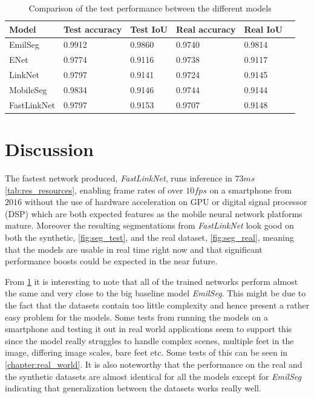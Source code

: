 \documentclass{kththesis}
\begin{document}
\begin{table}[]
\centering
\caption{Comparison of the test performance between the different models}
\label{tab:res_performance}
\begin{tabular}{@{}llllll@{}}
\toprule
Model       & Test accuracy & Test IoU & Real accuracy & Real IoU \\ \midrule
EmilSeg    & 0.9912 & 0.9860 & 0.9740 & 0.9814 \\
ENet       & 0.9774 & 0.9116 & 0.9738 & 0.9117 \\
LinkNet    & 0.9797 & 0.9141 & 0.9724 & 0.9145 \\
MobileSeg  & 0.9834 & 0.9146 & 0.9744 & 0.9144 \\ 
FastLinkNet& 0.9797 & 0.9153 & 0.9707 & 0.9148 \\  \bottomrule
\end{tabular}
\end{table}

\chapter{Discussion}
The fastest network produced, \textit{FastLinkNet}, runs inference in \(73 ms\)
\cref{tab:res_resources}, enabling frame rates of over \(10fps\) on a smartphone
from \(2016\) without the use of hardware acceleration on GPU or digital signal
processor (DSP) which are both
expected features as the mobile neural network platforms mature.
Moreover the resulting segmentations from \textit{FastLinkNet} look good on both
the synthetic, \cref{fig:seg_test}, and the real dataset, \cref{fig:seg_real}, meaning that
the models are usable in real time right now and that significant performance
boosts could be expected in the near future.

From \cref{tab:res_performance} it is interesting to note that all of the
trained networks perform almost the same and very close to the big baseline
model \textit{EmilSeg}. This might be due to the fact that the datasets contain
too little complexity and hence present a rather easy problem for
the models. Some tests from running the models on a smartphone and testing it
out in real world applications seem to support this since the model really
struggles to handle complex scenes, multiple feet in the image, differing image
scales, bare feet etc. Some tests of this can be seen in \cref{chapter:real_world}.
It is also noteworthy that the performance on the real and the synthetic
datasets are almost identical for all the models except for \textit{EmilSeg}
indicating that generalization between the datasets works really well.
\end{document}
